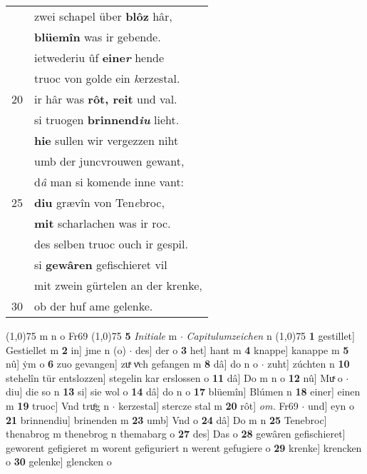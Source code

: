 \documentclass[8pt,a4paper,notitlepage]{article}
\begin{document}
\begin{table}[ht]
\begin{minipage}[t]{0.5\linewidth}
\begin{tabular}{rl}
 & zwei schapel über \textbf{blôz} hâr,\\ 
 & \textbf{blüemîn} was ir gebende.\\ 
 & ietwederiu ûf \textbf{eine\textit{r}} hende\\ 
 & truoc von golde ein \textit{k}erzestal.\\ 
20 & ir hâr was \textbf{rôt, reit} und val.\\ 
 & si truogen \textbf{brinnend\textit{iu}} lieht.\\ 
 & \textbf{hie} sullen wir vergezzen niht\\ 
 & umb der juncvrouwen gewant,\\ 
 & d\textit{â} man si komende inne vant:\\ 
25 & \textbf{diu} grævîn von Ten\textit{e}broc,\\ 
 & \textbf{mit} scharlachen was ir roc.\\ 
 & des selben truoc ouch ir gespil.\\ 
 & si \textbf{gewâren} gefischieret vil\\ 
 & mit zwein gürtelen an der krenke,\\ 
30 & ob der huf ame gelenke.\\ 
\end{tabular}
\scriptsize
\line(1,0){75} \newline
m n o Fr69 \newline
\line(1,0){75} \newline
\textbf{5} \textit{Initiale} m   $\cdot$ \textit{Capitulumzeichen} n  \newline
\line(1,0){75} \newline
\textbf{1} gestillet] Gestiellet m \textbf{2} in] jme n (o)  $\cdot$ des] der o \textbf{3} het] hant m \textbf{4} knappe] kanappe m \textbf{5} nû] ẏm o \textbf{6} zuo gevangen] zuͯ vͯch gefangen m \textbf{8} dâ] do n o  $\cdot$ zuht] zúchten n \textbf{10} stehelîn tür entslozzen] stegelin kar erslossen o \textbf{11} dâ] Do m n o \textbf{12} nû] Muͯ o  $\cdot$ diu] die so n \textbf{13} si] sie wol o \textbf{14} dâ] do n o \textbf{17} blüemîn] Blúmen n \textbf{18} einer] einen m \textbf{19} truoc] Vnd truͦg n  $\cdot$ kerzestal] stercze stal m \textbf{20} rôt] \textit{om.} Fr69  $\cdot$ und] eyn o \textbf{21} brinnendiu] brinenden m \textbf{23} umb] Vnd o \textbf{24} dâ] Do m n \textbf{25} Tenebroc] thenabrog m thenebrog n themabarg o \textbf{27} des] Das o \textbf{28} gewâren gefischieret] geworent gefigieret m worent gefiguriert n werent gefugiere o \textbf{29} krenke] krencken o \textbf{30} gelenke] glencken o \newline
\end{minipage}
\end{table}
\end{document}
